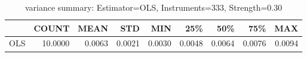 \begin{table}[ht]
\centering
\caption{variance summary: Estimator=OLS, Instruments=333, Strength=0.30}
\begin{tabular}{lrrrrrrrr}
\toprule
 & COUNT & MEAN & STD & MIN & 25\% & 50\% & 75\% & MAX \\
\midrule
OLS & 10.0000 & 0.0063 & 0.0021 & 0.0030 & 0.0048 & 0.0064 & 0.0076 & 0.0094 \\
\bottomrule
\end{tabular}
\end{table}
